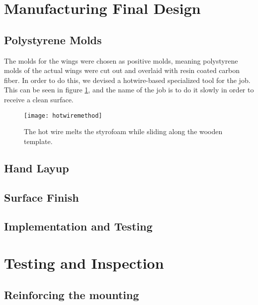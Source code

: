 \section{Manufacturing Final Design}
  \subsection{Polystyrene Molds}

  The molds for the wings were chosen as positive molds, meaning polystyrene molds of the actual wings were cut out and overlaid with resin coated carbon fiber. In order to do this, we devised a hotwire-based specialized tool for the job. This can be seen in figure \ref{fig:hotwire}, and the name of the job is to do it slowly in order to receive a clean surface.

  \begin{figure}
    \texttt{[image: hotwiremethod]}
    \caption{The hot wire melts the styrofoam while sliding along the wooden template.}
    \label{fig:hotwire}
  \end{figure}

  \subsection{Hand Layup}


  \subsection{Surface Finish}

  \subsection{Implementation and Testing}

\section{Testing and Inspection}

  \subsection{Reinforcing the mounting}
